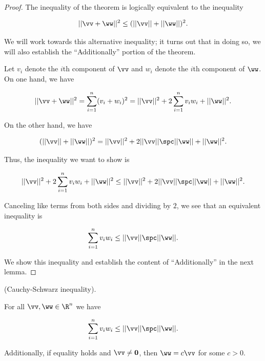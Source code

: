 \begin{proof}
	The inequality of the theorem is logically equivalent to the inequality
	
	\begin{align*}
		||\vv + \ww||^2 \leq (||\vv|| + ||\ww||)^2.
	\end{align*}	
	
	We will work towards this alternative inequality; it turns out that in doing so, we will also establish the ``Additionally'' portion of the theorem.
	
	Let $v_i$ denote the $i$th component of $\vv$ and $w_i$ denote the $i$th component of $\ww$. On one hand, we have
	
	\begin{align*}
		||\vv + \ww||^2 = \sum_{i = 1}^n (v_i + w_i)^2 = ||\vv||^2 + 2\sum_{i = 1}^n v_i w_i + ||\ww||^2.
	\end{align*}	
	
	On the other hand, we have
	
	\begin{align*}
		(||\vv|| + ||\ww||)^2 = ||\vv||^2 + 2||\vv|| \spc ||\ww|| + ||\ww||^2. 
	\end{align*}
	
	Thus, the inequality we want to show is
	
	\begin{align*}
		||\vv||^2 + 2\sum_{i = 1}^n v_i w_i + ||\ww||^2 \leq ||\vv||^2 + 2||\vv|| \spc ||\ww|| + ||\ww||^2.
	\end{align*}
	
	Canceling like terms from both sides and dividing by $2$, we see that an equivalent inequality is
	
	\begin{align*}
		\sum_{i = 1}^n v_i w_i \leq ||\vv|| \spc ||\ww||.
	\end{align*}
	
	We show this inequality and establish the content of ``Additionally'' in the next lemma.
\end{proof}

\begin{lemma}
	(Cauchy-Schwarz inequality).
	
	For all $\vv, \ww \in \R^n$ we have
	
	\begin{align*}
		\sum_{i = 1}^n v_i w_i \leq ||\vv|| \spc ||\ww||.
	\end{align*}
	
	Additionally, if equality holds and $\vv \neq \mathbf{0}$, then $\ww = c\vv$ for some $c > 0$.
\end{lemma}

